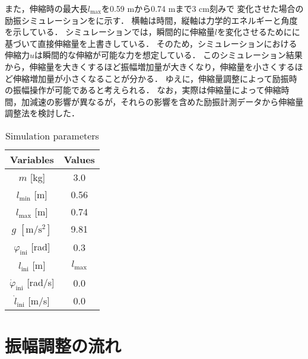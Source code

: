           また，伸縮時の最大長$l_{\mathrm{max}}$を0.59 mから0.74 mまで3 cm刻みで
          変化させた場合の励振シミュレーションをに示す．
          横軸は時間，縦軸は力学的エネルギーと角度を示している．
          シミュレーションでは，瞬間的に伸縮量$l$を変化させるためにに基づいて直接伸縮量を上書きしている．
          そのため，シミュレーションにおける伸縮力$u$は瞬間的な伸縮が可能な力を想定している．
          このシミュレーション結果から，伸縮量を大きくするほど振幅増加量が大きくなり，伸縮量を小さくするほど伸縮増加量が小さくなることが分かる．
          ゆえに，伸縮量調整によって励振時の振幅操作が可能であると考えられる．
          なお，実際は伸縮量によって伸縮時間，加減速の影響が異なるが，それらの影響を含めた励振計測データから伸縮量調整法を検討した．
          \begin{table}[tb]
            \begin{center}
              \caption{Simulation parameters}
              \vspace{2mm}
              \begin{tabular}{c|c}
                \hline
                Variables & Values \\
                \hline
                $m$ [kg] & 3.0 \\
                $l_{\mathrm{min}}$ [m] & 0.56 \\
                $l_{\mathrm{max}}$ [m] & 0.74 \\
                $g$ $\mathrm{[m/s^2]}$ & 9.81 \\
                $\varphi_{\mathrm{ini}}$ [rad] & 0.3 \\
                $l_{\mathrm{ini}}$ [m]& $l_{\mathrm{max}}$ \\
                $\dot{\varphi}_{\mathrm{ini}}$ [rad/s] & 0.0 \\
                $\dot{l}_{\mathrm{ini}}$ [m/s] & 0.0 \\
                \hline
              \end{tabular}
            \end{center}
          \end{table}
        
          
        \newpage
        \section{振幅調整の流れ}

